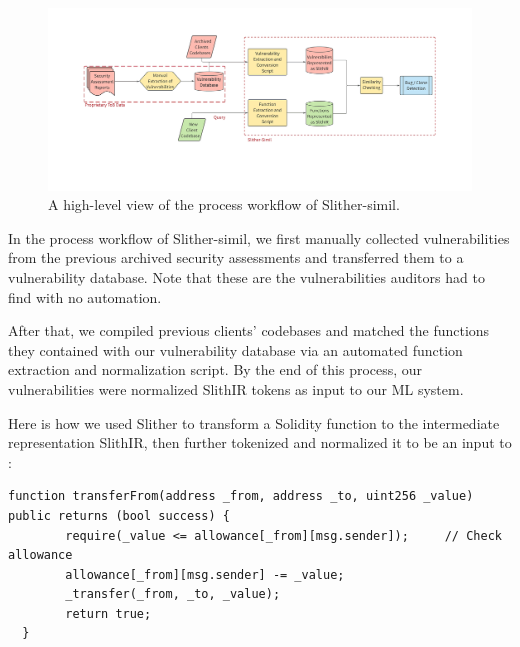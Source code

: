 \begin{figure}
  \centering
  \includegraphics[width=\textwidth]{figures/slitherS.png}
  \caption{A high-level view of the process workflow of Slither-simil.}
  \label{fig:slithersimilhighlevel}
\end{figure}

In the process workflow of Slither-simil, we first manually collected vulnerabilities from the previous archived security assessments and transferred them to a vulnerability database.
Note that these are the vulnerabilities auditors had to find with no automation.

After that, we compiled previous clients' codebases and matched the functions they contained with our vulnerability database via an automated function extraction and normalization script.
By the end of this process, our vulnerabilities were normalized SlithIR tokens as input to our ML system.

Here is how we used Slither to transform a Solidity function to the intermediate representation SlithIR, then further tokenized and normalized it to be an input to \slithersimil:

\begin{lstlisting}[float,caption= complete Solidity function from the contract TurtleToken.sol., escapechar=\%, language=Solidity, label=lst:solidity-bug]
  function transferFrom(address _from, address _to, uint256 _value) public returns (bool success) {
        require(_value <= allowance[_from][msg.sender]);     // Check allowance
        allowance[_from][msg.sender] -= _value;
        _transfer(_from, _to, _value);
        return true;
  }
  \end{lstlisting}


